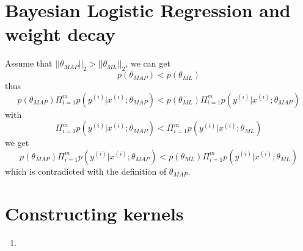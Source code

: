 \documentclass[12pt]{article}
\begin{document}
    \newpage
    \section*{Bayesian Logistic Regression and weight decay }
    Assume that $||\theta_{MAP}||_2 > ||\theta_{ML}||_2$,
    we can get $$p(\theta_{MAP}) < p(\theta_{ML})$$
    thus $$p(\theta_{MAP})\Pi_{i=1}^{m}p(y^{(i)}|x^{(i)};\theta_{MAP}) < p(\theta_{ML})\Pi_{i=1}^{m}p(y^{(i)}|x^{(i)};\theta_{MAP})$$
    with $$\Pi_{i=1}^{m}p(y^{(i)}|x^{(i)};\theta_{MAP}) < \Pi_{i=1}^{m}p(y^{(i)}|x^{(i)};\theta_{ML})$$
    we get $$p(\theta_{MAP})\Pi_{i=1}^{m}p(y^{(i)}|x^{(i)};\theta_{MAP}) < p(\theta_{ML})\Pi_{i=1}^{m}p(y^{(i)}|x^{(i)};\theta_{ML})$$
    which is contradicted with the definition of $\theta_{MAP}$.

    \section*{ Constructing kernels }
    \begin{enumerate}[label=(\alph*)]
        \item 
    \end{enumerate}
\end{document}
